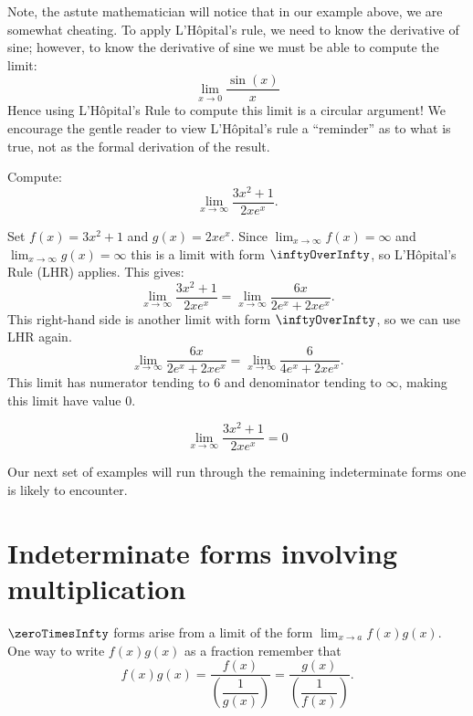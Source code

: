 \documentclass{ximera}
\begin{document}
\begin{remark}
  Note, the astute mathematician will notice that in our example
  above, we are somewhat cheating. To apply L'H\^ opital's rule, we
  need to know the derivative of sine; however, to know the derivative
  of sine we must be able to compute the limit:
  \[  \lim_{x\to 0}\frac{\sin(x)}{x} \]
  Hence using L'H\^{o}pital's Rule to compute this limit is a circular
  argument! We encourage the gentle reader to view L'H\^{o}pital's rule
  a ``reminder'' as to what is true, not as the formal derivation of
  the result.
\end{remark}

\begin{example}
	Compute:
	\[ \lim_{x\to \infty} \dfrac{3x^2 + 1}{2xe^x}.\]

	\begin{explanation}
		Set $f(x) =3x^2+1$ and $g(x)=2xe^x$. 
		Since $\displaystyle \lim_{x\to \infty}f(x) = \infty$ and $\displaystyle \lim_{x\to \infty} g(x) = \infty$
		this is a limit with form $\inftyOverInfty$, so L'H\^{o}pital's Rule (LHR) applies. This gives:
		\[ \lim_{x\to \infty} \dfrac{3x^2 + 1}{2xe^x} = \lim_{x\to \infty}\dfrac{6x}{2e^x + 2xe^x}. \]
		This right-hand side is another limit with form $\inftyOverInfty$, so we can use LHR again.
		\[ \lim_{x\to \infty}\dfrac{6x}{2e^x + 2xe^x} = \lim_{x\to \infty}\dfrac{6}{4e^x + 2xe^x}. \]
		This limit has numerator tending to $6$ and denominator tending to $\infty$, making this limit have value $0$.
		
		\[ \lim_{x\to \infty}\dfrac{3x^2+1}{2xe^x} = 0\]
	\end{explanation}
\end{example}



Our next set of examples will run through the remaining indeterminate
forms one is likely to encounter.
\section{Indeterminate forms involving multiplication}

$\zeroTimesInfty$ forms arise from a limit of the form $\displaystyle \lim_{x\to a}f(x)g(x)$. One way to write $f(x)g(x)$ as a fraction remember that
\[ f(x)g(x) = \dfrac{f(x)}{\left(\dfrac{1}{g(x)}\right)} = \dfrac{g(x)}{\left(\dfrac{1}{f(x)}\right)}. \]
\end{document}
